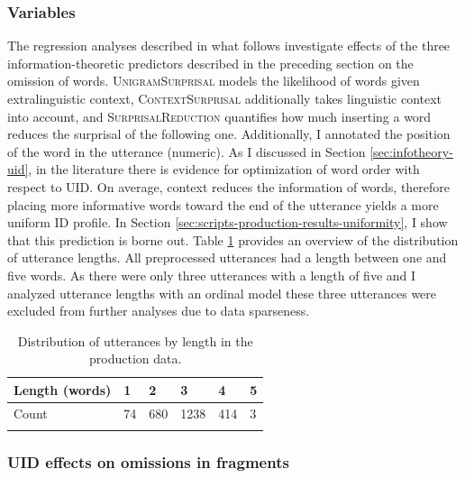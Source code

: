 \subsubsection{Variables}
The regression analyses described in what follows investigate effects of the three information-theoretic predictors described in the preceding section on the omission of words. \textsc{UnigramSurprisal} models the likelihood of words given extralinguistic context, \textsc{ContextSurprisal} additionally takes linguistic context into account, and \textsc{SurprisalReduction} quantifies how much inserting a word reduces the surprisal of the following one. Additionally, I annotated the position of the word in the utterance (numeric). As I discussed in Section \ref{sec:infotheory-uid}, in the literature there is evidence for optimization of word order with respect to UID. On average, context reduces the information of words, therefore placing more informative words toward the end of the utterance yields a more uniform ID profile. In Section \ref{sec:scripts-production-results-uniformity}, I show that this prediction is borne out. Table \ref{tab:production-length} provides an overview of the distribution of utterance lengths. All preprocessed utterances had a length between one and five words. As there were only three utterances with a length of five and I analyzed utterance lengths with an ordinal model these three utterances were excluded from further analyses due to data sparseness.

\begin{table}
\begin{tabular}{l p{1cm} p{.9cm} p{.9cm} p{.9cm} p{.9cm}}
\lsptoprule
Length (words) & 1 & 2 & 3 & 4 & 5\\
\midrule
Count & 74 & 680 &1238 & 414& 3\\
\lspbottomrule
\end{tabular}
\caption{Distribution of utterances by length in the production data.\label{tab:production-length}}
\end{table}

\subsubsection{UID effects on omissions in fragments}
\label{sec:scripts-production-results-surprisal}

